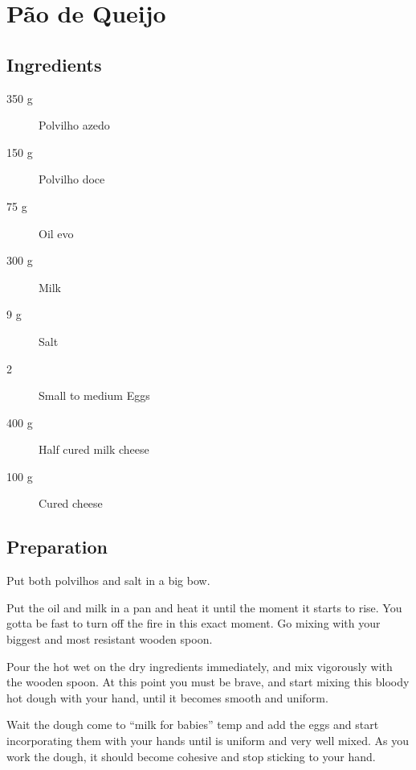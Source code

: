 \setchapterpreamble[u]{\margintoc}
\chapter{Pão de Queijo}

\section{Ingredients}

\begin{multicols}{2}
\begin{description}
	\item[350 g] Polvilho azedo
	\item[150 g] Polvilho doce
	\item[75 g] Oil \gls{evo}
	\item[300 g] Milk
	\item[9 g] Salt
	\item[2 ] Small to medium Eggs
	\item[400 g] Half cured milk cheese
	\item[100 g] Cured cheese
\end{description}
\end{multicols}

\section{Preparation}
Put both polvilhos and salt in a big bow.

Put the oil and milk in a pan and heat it until the moment it starts to rise. You gotta be fast to turn off the fire in this exact moment. 
%
Go mixing with your biggest and most resistant wooden spoon.

Pour the hot wet on the dry ingredients immediately, and mix vigorously with the wooden spoon.
%
At this point you must be brave, and start mixing this bloody hot dough with your hand, until it becomes smooth and uniform.

Wait the dough come to ``milk for babies'' temp and add the eggs and start incorporating them with your hands until is uniform and very well mixed.
%
As you work the dough, it should become cohesive and stop sticking to your hand.

